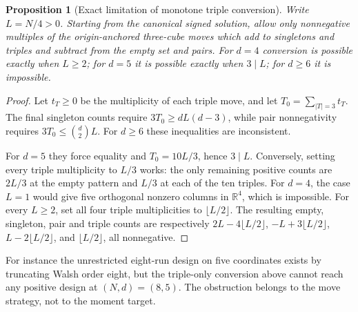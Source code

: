 \documentclass[11pt]{article}
\newtheorem{proposition}{Proposition}[section]
\newcommand{\R}{\mathbb R}
\begin{document}
\begin{proposition}[Exact limitation of monotone triple conversion]
Write $L=N/4>0$. Starting from the canonical signed solution, allow only
nonnegative multiples of the origin-anchored three-cube moves which add
to singletons and triples and subtract from the empty set and pairs.
For $d=4$ conversion is possible exactly when $L\ge2$; for $d=5$ it is
possible exactly when $3\mid L$; for $d\ge6$ it is impossible.
\end{proposition}
\begin{proof}
Let $t_T\ge0$ be the multiplicity of each triple move, and let
$T_0=\sum_{|T|=3}t_T$. The final singleton counts require
$3T_0\ge dL(d-3)$, while pair nonnegativity requires
$3T_0\le\binom d2L$. For $d\ge6$ these inequalities are inconsistent.

For $d=5$ they force equality and $T_0=10L/3$, hence $3\mid L$.
Conversely, setting every triple multiplicity to $L/3$ works: the only
remaining positive counts are $2L/3$ at the empty pattern and $L/3$
at each of the ten triples. For $d=4$, the case $L=1$ would give five
orthogonal nonzero columns in $\R^4$, which is impossible. For every
$L\ge2$, set all four triple multiplicities to $\lfloor L/2\rfloor$.
The resulting empty, singleton, pair and triple counts are respectively
$2L-4\lfloor L/2\rfloor$, $-L+3\lfloor L/2\rfloor$,
$L-2\lfloor L/2\rfloor$, and $\lfloor L/2\rfloor$, all nonnegative.
\end{proof}
For instance the unrestricted eight-run design on five coordinates
exists by truncating Walsh order eight, but the triple-only conversion
above cannot reach any positive design at $(N,d)=(8,5)$. The obstruction
belongs to the move strategy, not to the moment target.
\end{document}
